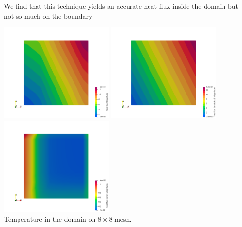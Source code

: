 We find that this technique yields an accurate heat flux inside the domain 
but not so much on the boundary:

\begin{center}
\includegraphics[width=5.7cm]{python_codes/fieldstone_173/results/q8}
\includegraphics[width=5.7cm]{python_codes/fieldstone_173/results/q8_analytical}
\includegraphics[width=5.7cm]{python_codes/fieldstone_173/results/q8_error}\\
{\captionfont Temperature in the domain on $8 \times 8$ mesh.}
\end{center}


